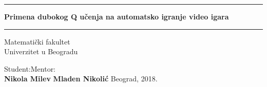 \documentclass[12pt]{report}
\begin{document}
\begin{titlepage}
    \begin{center}
    
        \vspace*{1cm}
        \hrule
        \vspace*{1cm}
        \textbf{Primena dubokog Q učenja na automatsko igranje video igara}
        \vspace*{1cm}
        \hrule
        \vspace{1cm}
        
		
        \begin{center}
        	Matematički fakultet \\
        	Univerzitet u Beogradu
        \end{center}
        \vspace{1.5cm}
        Student:\hfill Mentor:\\
        \textbf{Nikola Milev}
		\hfill        
        \textbf{Mladen Nikolić}
        \vfill
		Beograd, 2018.
    \end{center}
\end{titlepage}
\end{document}
